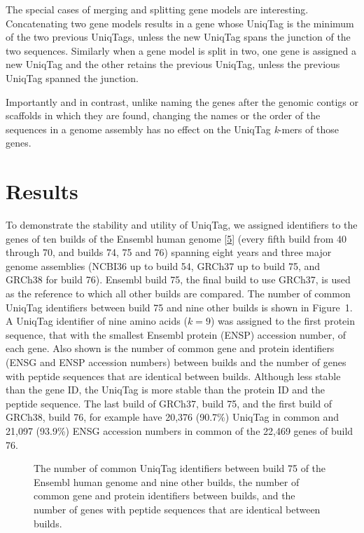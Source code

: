 \documentclass[10pt]{article}
\begin{document}
The special cases of merging and splitting gene models are interesting.
Concatenating two gene models results in a gene whose UniqTag is the
minimum of the two previous UniqTags, unless the new UniqTag spans the
junction of the two sequences. Similarly when a gene model is split in
two, one gene is assigned a new UniqTag and the other retains the
previous UniqTag, unless the previous UniqTag spanned the junction.

Importantly and in contrast, unlike naming the genes after the genomic
contigs or scaffolds in which they are found, changing the names or the
order of the sequences in a genome assembly has no effect on the UniqTag
\emph{k}-mers of those genes.

\section{Results}\label{results}

To demonstrate the stability and utility of UniqTag, we assigned
identifiers to the genes of ten builds of the Ensembl human genome
{[}\href{http://dx.doi.org/10.1093/nar/gku1010}{5}{]} (every fifth build
from 40 through 70, and builds 74, 75 and 76) spanning eight years and
three major genome assemblies (NCBI36 up to build 54, GRCh37 up to build
75, and GRCh38 for build 76). Ensembl build 75, the final build to use
GRCh37, is used as the reference to which all other builds are compared.
The number of common UniqTag identifiers between build 75 and nine other
builds is shown in Figure~1. A UniqTag identifier of nine amino acids
(\(k=9\)) was assigned to the first protein sequence, that with the
smallest Ensembl protein (ENSP) accession number, of each gene. Also
shown is the number of common gene and protein identifiers (ENSG and
ENSP accession numbers) between builds and the number of genes with
peptide sequences that are identical between builds. Although less
stable than the gene ID, the UniqTag is more stable than the protein ID
and the peptide sequence. The last build of GRCh37, build 75, and the
first build of GRCh38, build 76, for example have 20,376 (90.7\%)
UniqTag in common and 21,097 (93.9\%) ENSG accession numbers in common
of the 22,469 genes of build 76.

\begin{figure}[htbp]
\centering
\caption{The number of common UniqTag identifiers between build 75 of
the Ensembl human genome and nine other builds, the number of common
gene and protein identifiers between builds, and the number of genes
with peptide sequences that are identical between builds.}
\end{figure}
\end{document}
